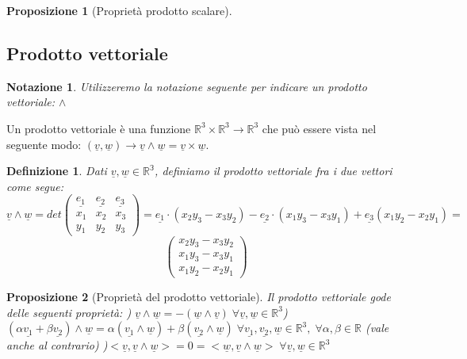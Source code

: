 \documentclass[12pt]{article}
\newenvironment{para}{\begin{adjustwidth}{13mm}{}}{\end{adjustwidth}}
\newtheorem{Definizione}{Definizione}[subsection]
\newtheorem{Proposizione}{Proposizione}[subsection]
\newtheorem{Notazione}{Notazione}[subsection]
\begin{document}
\begin{para}
\begin{Proposizione}[Proprietà prodotto scalare]
\end{Proposizione}
\subsection{Prodotto vettoriale}
\begin{Notazione}
    Utilizzeremo la notazione seguente per indicare un prodotto vettoriale: $\land$
\end{Notazione}
Un prodotto vettoriale è una funzione $\mathbb{R}^3 \times \mathbb{R}^3 \rightarrow \mathbb{R}^3$ che può essere vista nel seguente modo: $(\underline{v}, \underline{w}) \rightarrow  \underline{v} \land \underline{w} = \underline{v} \times \underline{w}$.
\begin{Definizione}
    Dati $\underline{v}, \underline{w} \in \mathbb{R^3}$, definiamo il prodotto vettoriale fra i due vettori come segue: $$\underline{v} \land \underline{w} = det\begin{pmatrix}
        \underline{e_1} & \underline{e_2} & \underline{e_3} \\
        x_1 & x_2 & x_3 \\
        y_1 & y_2 & y_3
    \end{pmatrix} = \underline{e_1} \cdot (x_2y_3 - x_3y_2) -\underline{e_2}\cdot(x_1y_3-x_3y_1)+\underline{e_3}(x_1y_2-x_2y_1)=$$\newline $$\begin{pmatrix}
        x_2y_3 - x_3y_2 \\
        x_1y_3 - x_3y_1 \\
        x_1y_2 - x_2y_1
    \end{pmatrix}$$
\end{Definizione}
\begin{Proposizione}[Proprietà del prodotto vettoriale]
Il prodotto vettoriale gode delle seguenti proprietà: ) $\underline{v} \land \underline{w} = -(\underline{w} \land \underline{v}) \; \forall\underline{v}, \underline{w} \in \mathbb{R}^3$) $(\alpha\underline{v_1}+\beta\underline{v_2}) \land \underline{w} = \alpha(\underline{v_1} \land \underline{w}) + \beta(\underline{v_2} \land \underline{w}) \; \forall\underline{v_1}, \underline{v_2}, \underline{w} \in \mathbb{R}^3, \; \forall \alpha, \beta \in \mathbb{R}$ (vale anche al contrario) )$<\underline{v}, \underline{v} \land \underline{w}> = 0 = <\underline{w}, \underline{v} \land \underline{w}> \; \forall\underline{v}, \underline{w} \in \mathbb{R}^3$\newline

\end{Proposizione}
\end{para}
\end{document}
